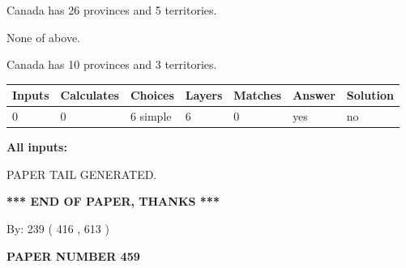 \documentclass[12pt]{article}
\begin{document}
 
Canada has  26 provinces and  5 territories.
 
 
 None of above.
 
 
\noindent{}
 
 
Canada has 10  provinces and 3 territories.
 
 
\noindent{}
 
 
   
   
   
   
\noindent\begin{tabular}{|l|l|l|l|l|l|l|}
 \hline
Inputs & Calculates & Choices & Layers & Matches & Answer & Solution \\ \hline
 0  & 
 0  & 
 6
  simple  
  & 
 6  & 
 0  & 
  yes & 
  no 
  \\ \hline
 \end{tabular}
   
   
   
   
\noindent{}
   
   
   
   
\noindent\vspace{0.1in}\hspace{-0.08in} {\textbf{\Large{All inputs: }}}
   
   
   
   
   
   
 \vspace{0.2in}
 
   
   
\vspace{2.0in} PAPER TAIL GENERATED.
   
   
   
   
\vspace{1.0in} 
{\textbf{\large{ *** END OF PAPER, THANKS *** }}} 
   
   
\hspace{1.0in} By: 
 239 ( 416 ,  613 )
   
   
   
   
\newpage 
\setcounter{page}{ 
   459001 } 
   
   
   
   
 {\textbf{ \Large{ PAPER NUMBER  459  }}}
   
\end{document}
